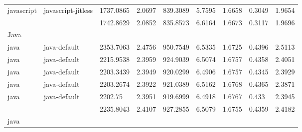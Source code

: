 \begin{longtable}[h]{|lllllllll|}
javascript     & javascript-jitless     & 1737.0865                 & 2.0697                                                               & 839.3089              & 5.7595           & 1.6658           & 0.3049       & 1.9654        \\
               &                        & 1742.8629                 & 2.0852                                                               & 835.8573              & 6.6164           & 1.6673           & 0.3117       & 1.9696        \\
Java           &                        &                           &                                                                      &                       &                  &                  &              &               \\
java           & java-default           & 2353.7063                 & 2.4756                                                               & 950.7549              & 6.5335           & 1.6725           & 0.4396       & 2.5113        \\
java           & java-default           & 2215.9538                 & 2.3959                                                               & 924.9039              & 6.5074           & 1.6757           & 0.4358       & 2.4051        \\
java           & java-default           & 2203.3439                 & 2.3949                                                               & 920.0299              & 6.4906           & 1.6757           & 0.4345       & 2.3929        \\
java           & java-default           & 2203.2674                 & 2.3922                                                               & 921.0389              & 6.5162           & 1.6768           & 0.4365       & 2.3871        \\
java           & java-default           & 2202.75                   & 2.3951                                                               & 919.6999              & 6.4918           & 1.6767           & 0.433        & 2.3945        \\
               &                        & 2235.8043                 & 2.4107                                                               & 927.2855              & 6.5079           & 1.6755           & 0.4359       & 2.4182        \\
java           &                        &                           &                                                                      &                       &                  &                  &              &               \\

\end{longtable}
